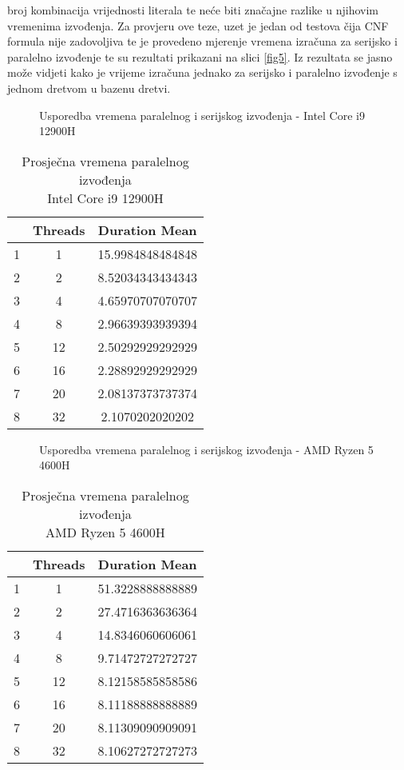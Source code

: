 \documentclass[hidelinks, conference]{IEEEtran}
\begin{document}
broj kombinacija vrijednosti literala te neće biti značajne razlike u njihovim vremenima izvođenja. Za provjeru ove teze, uzet je jedan od testova čija CNF formula nije zadovoljiva te je provedeno mjerenje vremena izračuna za serijsko i paralelno izvođenje te su rezultati prikazani na slici \ref{fig5}. Iz rezultata se jasno može vidjeti kako je vrijeme izračuna jednako za serijsko i paralelno izvođenje s jednom dretvom u bazenu dretvi.


\begin{figure}[ht]
\centerline{}
\caption{Usporedba vremena paralelnog i serijskog izvođenja - Intel Core i9 12900H}
\label{fig1}
\end{figure}

\begin{table}[ht]
\centering
\caption{Prosječna vremena paralelnog izvođenja \\ Intel Core i9 12900H}
\renewcommand{\arraystretch}{1.3}
\begin{tabular}{||c | c | c||} 
 \hline
  & Threads & Duration Mean \\ [0.5ex] 
 \hline \hline
 1&1&15.9984848484848 \\\hline
 2&2&8.52034343434343 \\\hline
 3&4&4.65970707070707 \\\hline
 4&8&2.96639393939394 \\\hline
 5&12&2.50292929292929 \\\hline
 6&16&2.28892929292929 \\\hline
 7&20&2.08137373737374 \\\hline
 8&32&2.1070202020202 \\ \hline
 \hline
\end{tabular}
\label{table:1}
\end{table}

\begin{figure}[ht]
\centerline{}
\caption{Usporedba vremena paralelnog i serijskog izvođenja - AMD Ryzen 5 4600H}
\label{fig2}
\end{figure}


\begin{table}[ht]
\centering
\caption{Prosječna vremena paralelnog izvođenja \\ AMD Ryzen 5 4600H}
\renewcommand{\arraystretch}{1.3}
\begin{tabular}{||c | c | c||} 
 \hline
  & Threads & Duration Mean \\ [0.5ex] 
 \hline \hline
 1&1&51.3228888888889 \\\hline
 2&2&27.4716363636364 \\\hline
 3&4&14.8346060606061 \\\hline
 4&8&9.71472727272727 \\\hline
 5&12&8.12158585858586 \\\hline
 6&16&8.11188888888889 \\\hline
 7&20&8.11309090909091 \\\hline
 8&32&8.10627272727273 \\ \hline
 \hline
\end{tabular}
\label{table:2}
\end{table}
\end{document}
